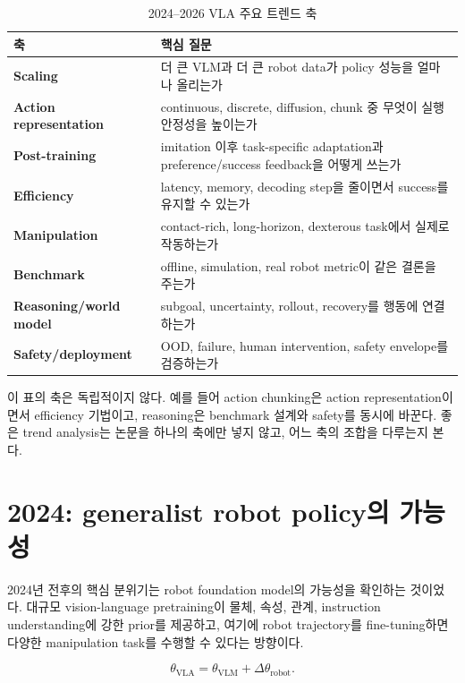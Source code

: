 \begin{table}[t]
  \centering
  \caption{2024--2026 VLA 주요 트렌드 축}
  \label{tab:vla_trend_axes}
  \begin{tabularx}{\textwidth}{>{\bfseries}p{30mm}X}
    \toprule
    축 & 핵심 질문 \\
    \midrule
    Scaling & 더 큰 VLM과 더 큰 robot data가 policy 성능을 얼마나 올리는가 \\
    Action representation & continuous, discrete, diffusion, chunk 중 무엇이 실행 안정성을 높이는가 \\
    Post-training & imitation 이후 task-specific adaptation과 preference/success feedback을 어떻게 쓰는가 \\
    Efficiency & latency, memory, decoding step을 줄이면서 success를 유지할 수 있는가 \\
    Manipulation & contact-rich, long-horizon, dexterous task에서 실제로 작동하는가 \\
    Benchmark & offline, simulation, real robot metric이 같은 결론을 주는가 \\
    Reasoning/world model & subgoal, uncertainty, rollout, recovery를 행동에 연결하는가 \\
    Safety/deployment & OOD, failure, human intervention, safety envelope를 검증하는가 \\
    \bottomrule
  \end{tabularx}
\end{table}

이 표의 축은 독립적이지 않다. 예를 들어 action chunking은 action representation이면서 efficiency 기법이고, reasoning은 benchmark 설계와 safety를 동시에 바꾼다. 좋은 trend analysis는 논문을 하나의 축에만 넣지 않고, 어느 축의 조합을 다루는지 본다.

\section{2024: generalist robot policy의 가능성}

2024년 전후의 핵심 분위기는 robot foundation model의 가능성을 확인하는 것이었다. 대규모 vision-language pretraining이 물체, 속성, 관계, instruction understanding에 강한 prior를 제공하고, 여기에 robot trajectory를 fine-tuning하면 다양한 manipulation task를 수행할 수 있다는 방향이다.

\begin{equation}
  \theta_{\mathrm{VLA}}
  =
  \theta_{\mathrm{VLM}}
  +
  \Delta\theta_{\mathrm{robot}}.
\end{equation}


